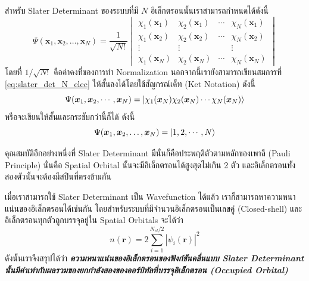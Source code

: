 สำหรับ Slater Determinant ของระบบที่มี $N$ อิเล็กตรอนนั้นเราสามารถกำหนดได้ดังนี้\autocite{szabo1996}
%
\begin{equation}\label{eq:slater_det_N_elec}
    \Psi(\bm{x}_{1}, \bm{x}_{2}, \dots, \bm{x}_{N}) =
    \frac{1}{\sqrt{N!}}
    \begin{vmatrix}
        \chi_{1}(\bm{x}_{1}) & \chi_{2}(\bm{x}_{1}) & \cdots & \chi_{N}(\bm{x}_{1}) \\
        \chi_{1}(\bm{x}_{2}) & \chi_{2}(\bm{x}_{2}) & \cdots & \chi_{N}(\bm{x}_{2}) \\
        \vdots               & \vdots               &        & \vdots               \\
        \chi_{1}(\bm{x}_{N}) & \chi_{2}(\bm{x}_{N}) & \cdots & \chi_{N}(\bm{x}_{N})
    \end{vmatrix}
\end{equation}
%
\noindent โดยที่ $1/\sqrt{N!}$ คือค่าคงที่ของการทำ Normalization นอกจากนี้เรายังสามารถเขียนสมการที่ \eqref{eq:slater_det_N_elec} ให้สั้นลงได้โดยใช้สัญกรณ์เค็ท (Ket Notation) ดังนี้
%
\begin{equation}\label{eq:slater_det_ket}
    \Psi(\bm{x}_{1}, \bm{x}_{2}, \cdots, \bm{x}_{N}) =
    \ket{\chi_{1}(\bm{x}_{N}) \chi_{2}(\bm{x}_{N}) \cdots \chi_{N}(\bm{x}_{N})}
\end{equation}
%
\noindent หรือจะเขียนให้สั้นและกระชับกว่านี้ก็ได้ ดังนี้
%
\begin{equation}\label{eq:slater_det_ket_short}
    \Psi(\bm{x}_{1}, \bm{x}_{2}, \dots, \bm{x}_{N}) =
    \ket{1, 2, \cdots, N}
\end{equation}

คุณสมบัติอีกอย่างหนึ่งที่ Slater Determinant มีนั่นก็คือประพฤติตัวตามหลักของเพาลี (Pauli Principle) นั่นคือ Spatial Orbital นั้นจะมีอิเล็กตรอนได้สูงสุดไม่เกิน 2 ตัว และอิเล็กตรอนทั้งสองตัวนั้นจะต้องมีสปินที่ตรงข้ามกัน\autocite{atkins2010}

เมื่อเราสามารถใช้ Slater Determinant เป็น Wavefunction ได้แล้ว เราก็สามารถหาความหนาแน่นของอิเล็กตรอนได้เช่นกัน โดยสำหรับระบบที่มีจำนวนอิเล็กตรอนเป็นเลขคู่ (Closed-shell) และอิเล็กตรอนทุกตัวถูกบรรจุอยู่ใน Spatial Orbitals จะได้ว่า
%
\begin{equation}\label{eq:density_slater}
    n(\bm{r}) = 2 \sum_{i=1}^{N_{el}/2} |\psi_{i}(\bm{r})|^{2}
\end{equation}
%
ดังนั้นเราจึงสรุปได้ว่า  \textbf{\textit{ความหนาแน่นของอิเล็กตรอนของฟังก์ชันคลื่นแบบ Slater Determinant นั้นมีค่าเท่ากับผลรวมของยกกำลังสองของออร์บิทัลที่บรรจุอิเล็กตรอน (Occupied Orbital)}}

